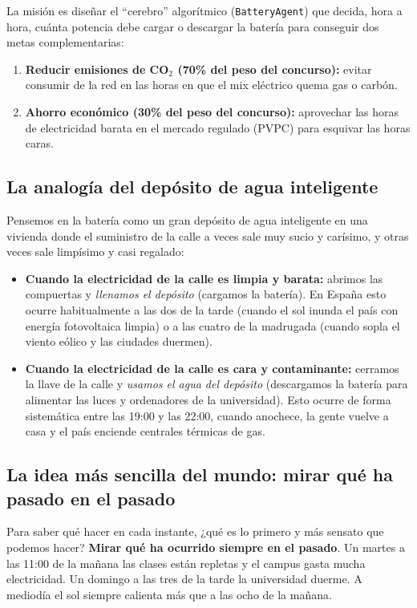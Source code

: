 \documentclass[a4paper,11pt]{article}
\begin{document}
La misión es diseñar el ``cerebro'' algorítmico (\texttt{BatteryAgent}) que decida, hora a hora, cuánta potencia debe cargar o descargar la batería para conseguir dos metas complementarias:
\begin{enumerate}\setlength\itemsep{0pt}
    \item \textbf{Reducir emisiones de CO$_2$ (70\% del peso del concurso):} evitar consumir de la red en las horas en que el mix eléctrico quema gas o carbón.
    \item \textbf{Ahorro económico (30\% del peso del concurso):} aprovechar las horas de electricidad barata en el mercado regulado (PVPC) para esquivar las horas caras.
\end{enumerate}

\subsection{La analogía del depósito de agua inteligente}
Pensemos en la batería como un gran depósito de agua inteligente en una vivienda donde el suministro de la calle a veces sale muy sucio y carísimo, y otras veces sale limpísimo y casi regalado:
\begin{itemize}
    \item \textbf{Cuando la electricidad de la calle es limpia y barata:} abrimos las compuertas y \emph{llenamos el depósito} (cargamos la batería). En España esto ocurre habitualmente a las dos de la tarde (cuando el sol inunda el país con energía fotovoltaica limpia) o a las cuatro de la madrugada (cuando sopla el viento eólico y las ciudades duermen).
    \item \textbf{Cuando la electricidad de la calle es cara y contaminante:} cerramos la llave de la calle y \emph{usamos el agua del depósito} (descargamos la batería para alimentar las luces y ordenadores de la universidad). Esto ocurre de forma sistemática entre las 19:00 y las 22:00, cuando anochece, la gente vuelve a casa y el país enciende centrales térmicas de gas.
\end{itemize}

\subsection{La idea más sencilla del mundo: mirar qué ha pasado en el pasado}
Para saber qué hacer en cada instante, ¿qué es lo primero y más sensato que podemos hacer? \textbf{Mirar qué ha ocurrido siempre en el pasado}. 
Un martes a las 11:00 de la mañana las clases están repletas y el campus gasta mucha electricidad. Un domingo a las tres de la tarde la universidad duerme. A mediodía el sol siempre calienta más que a las ocho de la mañana.
\end{document}
